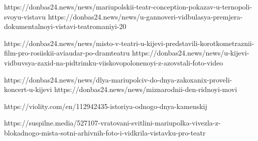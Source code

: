  
 
 
 
 


https://donbas24.news/news/mariupolskii-teatr-conception-pokazav-u-ternopoli-svoyu-vistavu
https://donbas24.news/news/u-gannoveri-vidbulasya-premjera-dokumentalnoyi-vistavi-teatromaniyi-20

https://donbas24.news/news/misto-v-teatri-u-kijevi-predstavili-korotkometraznii-film-pro-rosiiskii-aviaudar-po-dramteatru
https://donbas24.news/news/u-kijevi-vidbuvsya-zaxid-na-pidtrimku-viiskovopolonenoyi-z-azovstali-foto-video

https://donbas24.news/news/dlya-mariupolciv-do-dnya-zakoxanix-proveli-koncert-u-kijevi
https://donbas24.news/news/miznarodnii-den-ridnoyi-movi

https://violity.com/en/112942435-istoriya-odnogo-dnya-kamenskij


https://suspilne.media/527107-vratovani-svitlini-mariupolka-vivezla-z-blokadnogo-mista-sotni-arhivnih-foto-i-vidkrila-vistavku-pro-teatr

